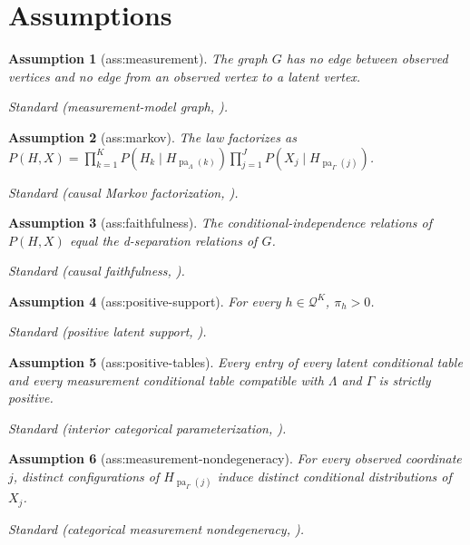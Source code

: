 \documentclass{article}
\newtheorem{assumption}{Assumption}
\begin{document}
\section{Assumptions}

\begin{assumption}[ass:measurement]\label{ass:measurement}
The graph \(G\) has no edge between observed vertices and no edge from an observed vertex to a latent vertex.
\par\smallskip\noindent\emph{Standard} (measurement-model graph, \cite{LeeGu2026DTBLCM}).
\end{assumption}

\begin{assumption}[ass:markov]\label{ass:markov}
The law factorizes as \(P(H,X)=\prod_{k=1}^KP(H_k\mid H_{\operatorname{pa}_{\Lambda}(k)})\prod_{j=1}^JP(X_j\mid H_{\operatorname{pa}_{\Gamma}(j)})\).
\par\smallskip\noindent\emph{Standard} (causal Markov factorization, \cite{LeeGu2026DTBLCM}).
\end{assumption}

\begin{assumption}[ass:faithfulness]\label{ass:faithfulness}
The conditional-independence relations of \(P(H,X)\) equal the d-separation relations of \(G\).
\par\smallskip\noindent\emph{Standard} (causal faithfulness, \cite{LeeGu2026DTBLCM}).
\end{assumption}

\begin{assumption}[ass:positive-support]\label{ass:positive-support}
For every \(h\in\mathcal Q^K\), \(\pi_h>0\).
\par\smallskip\noindent\emph{Standard} (positive latent support, \cite{LeeGu2026DTBLCM}).
\end{assumption}

\begin{assumption}[ass:positive-tables]\label{ass:positive-tables}
Every entry of every latent conditional table and every measurement conditional table compatible with \(\Lambda\) and \(\Gamma\) is strictly positive.
\par\smallskip\noindent\emph{Standard} (interior categorical parameterization, \cite{AllmanMatiasRhodes2009}).
\end{assumption}

\begin{assumption}[ass:measurement-nondegeneracy]\label{ass:measurement-nondegeneracy}
For every observed coordinate \(j\), distinct configurations of \(H_{\operatorname{pa}_{\Gamma}(j)}\) induce distinct conditional distributions of \(X_j\).
\par\smallskip\noindent\emph{Standard} (categorical measurement nondegeneracy, \cite{KivvaRajendranRavikumarAragam2021}).
\end{assumption}
\end{document}
